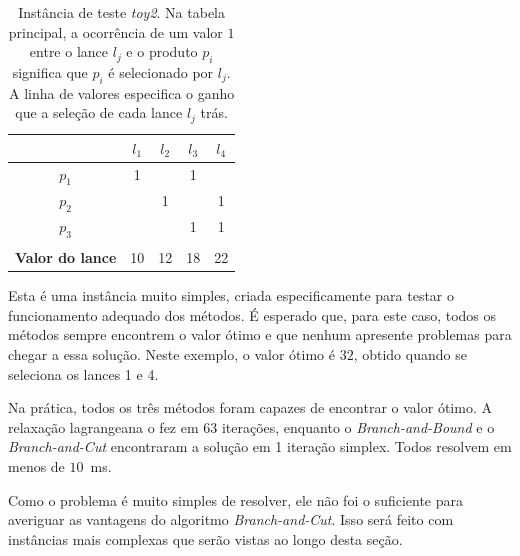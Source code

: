 \documentclass{article}
\begin{document}
	    \begin{table}[h]
	        \centering
	        \begin{tabular}{|c|c|c|c|c|}
	            \hline
	            \backslashbox{\bf Produto}{\bf Lance} & $ l_1 $ & $ l_2 $ & $ l_3 $ & $ l_4 $ \\\hline
	            $ p_1 $ & 1 & & 1 & \\\hline
	            $ p_2 $ & & 1 & & 1\\\hline
	            $ p_3 $ & & & 1 & 1 \\\hline
	            \multicolumn{5}{c}{\quad} \\\hline
	            \textbf{Valor do lance} & 10 & 12 & 18 & 22 \\\hline
	        \end{tabular}
	        \caption{Instância de teste \textit{toy2}. Na tabela principal, a ocorrência de um valor $1$ entre o lance $l_j$ e o produto $p_i$ significa que $p_i$ é selecionado por $l_j$.
	        A linha de valores especifica o ganho que a seleção de cada lance $l_j$ trás.}
	        \label{tab:toy2}
	    \end{table}
	    
	    Esta é uma instância muito simples, criada especificamente para testar o funcionamento adequado dos métodos. É esperado que, para este caso, todos os métodos sempre encontrem o valor ótimo e que nenhum apresente problemas para chegar a essa solução. Neste exemplo, o valor ótimo é $32$, obtido quando se seleciona os lances 1 e 4.
	    
	    Na prática, todos os três métodos foram capazes de encontrar o valor ótimo. A relaxação lagrangeana o fez em 63 iterações, enquanto o \emph{Branch-and-Bound} e o \emph{Branch-and-Cut} encontraram a solução em 1 iteração simplex. Todos resolvem em menos de $10$~ms.
	    
	    Como o problema é muito simples de resolver, ele não foi o suficiente para averiguar as vantagens do algoritmo \emph{Branch-and-Cut}. Isso será feito com instâncias mais complexas que serão vistas ao longo desta seção.
	    
	    
\end{document}
